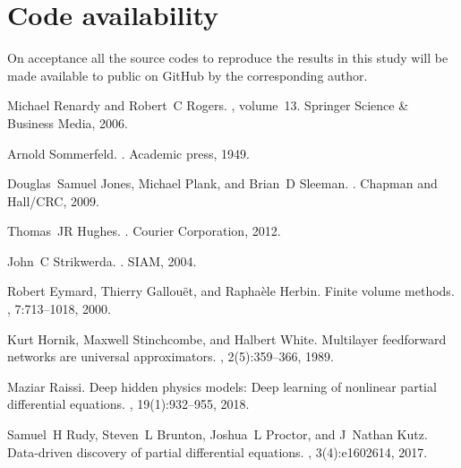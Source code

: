 \documentclass{article}
\begin{document}
\section*{Code availability}
On acceptance all the source codes to reproduce the results in this study will be made available to public on GitHub by the corresponding author.




\begin{thebibliography}{10}

Michael Renardy and Robert~C Rogers.
, volume~13.
\newblock Springer Science \& Business Media, 2006.

Arnold Sommerfeld.
.
\newblock Academic press, 1949.

Douglas~Samuel Jones, Michael Plank, and Brian~D Sleeman.
.
\newblock Chapman and Hall/CRC, 2009.

Thomas~JR Hughes.
.
\newblock Courier Corporation, 2012.

John~C Strikwerda.
.
\newblock SIAM, 2004.

Robert Eymard, Thierry Gallou{\"e}t, and Rapha{\`e}le Herbin.
\newblock Finite volume methods.
, 7:713--1018, 2000.

Kurt Hornik, Maxwell Stinchcombe, and Halbert White.
\newblock Multilayer feedforward networks are universal approximators.
, 2(5):359--366, 1989.

Maziar Raissi.
\newblock Deep hidden physics models: Deep learning of nonlinear partial
  differential equations.
, 19(1):932--955, 2018.

Samuel~H Rudy, Steven~L Brunton, Joshua~L Proctor, and J~Nathan Kutz.
\newblock Data-driven discovery of partial differential equations.
, 3(4):e1602614, 2017.


\end{thebibliography}
\end{document}
